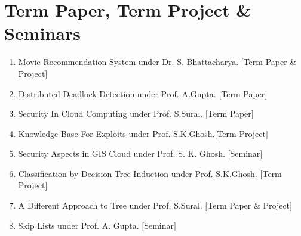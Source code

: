 \section{Term Paper, Term Project \& Seminars}
\vspace{-.1275in}
\begin{enumerate}[topsep=0pt,itemsep=-1ex,partopsep=1ex,parsep=1ex]
	\item Movie Recommendation System under Dr. S. Bhattacharya. \hfill $[$Term Paper \& Project$]$
	\item Distributed Deadlock Detection under Prof. A.Gupta. \hfill $[$Term Paper$]$
	\item Security In Cloud Computing under Prof. S.Sural. \hfill $[$Term Paper$]$
	\item Knowledge Base For Exploits under Prof. S.K.Ghosh.\hfill $[$Term Project$]$
	\item Security Aspects in GIS Cloud under Prof. S. K. Ghosh. \hfill $[$Seminar$]$
	\item Classification by Decision Tree Induction under Prof. S.K.Ghosh. \hfill $[$Term Project$]$
	\item A Different Approach to Tree under Prof. S.Sural. \hfill $[$Term Paper \& Project$]$
	\item Skip Lists under Prof. A. Gupta. \hfill $[$Seminar$]$
\end{enumerate}